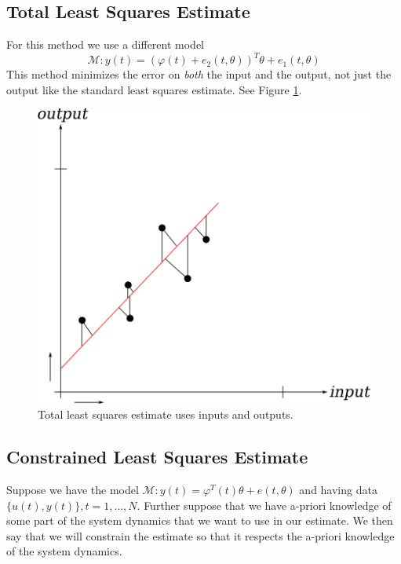 \subsection{Total Least Squares Estimate}
For this method we use a different model
$$\mathcal{M}: y(t) = (\varphi(t)+e_2(t,\theta))^T\theta+e_1(t,\theta)$$
This method minimizes the error on \textit{both} the input and the output, not just the output like the standard least squares estimate. See Figure \ref{fig:09totalLS}.

\begin{figure}[ht!]
  \centering
  \includegraphics[width=.3\textwidth]{images/09totalLS}
  \caption{Total least squares estimate uses inputs and outputs.}
  \label{fig:09totalLS}
\end{figure}

\subsection{Constrained Least Squares Estimate}
Suppose we have the model $\mathcal{M}: y(t) = \varphi^T(t)\theta + e(t,\theta)$ and having data $\{u(t),y(t)\}, t=1,\ldots,N$. Further suppose that we have a-priori knowledge of some part of the system dynamics that we want to use in our estimate. We then say that we will constrain the estimate so that it respects the a-priori knowledge of the system dynamics.

